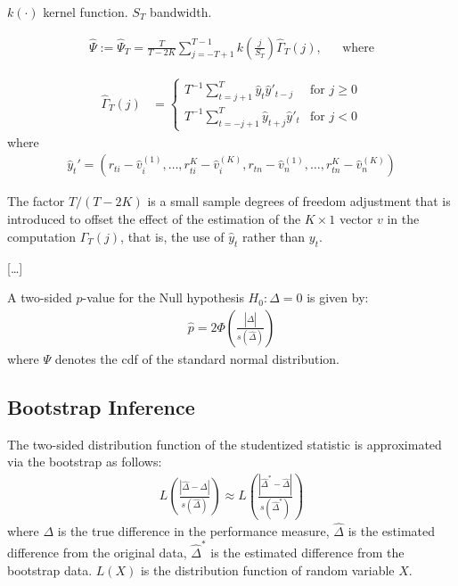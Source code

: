 \documentclass[12pt,oneside,a4paper]{article}
\begin{document}
$k(\cdot)$ kernel function.
$S_{T}$ bandwidth.

\begin{align*}
	\hat{\Psi} := \hat{\Psi}_{T} =
	\frac{T}{T-2K}
	\sum_{j=-T+1}^{T-1}
	k\left( \frac{j}{S_{T}} \right) \hat{\Gamma}_{T}(j), && \text{where}
\end{align*}

\begin{align*}
	\hat{\Gamma}_{T}(j) &=
\begin{cases}
	T^{-1} \sum_{t=j+1}^{T}	\hat{y}_{t} \hat{y}'_{t-j} & \text{for } j \geq 0
	\\
	T^{-1} \sum_{t=-j+1}^{T} \hat{y}_{t+j} \hat{y}'_{t}& \text{for } j<0
\end{cases}
\end{align*}
where
\begin{align*}
	\hat{y}_{t}' = 
\left(
	r_{ti} - \hat{v}_{i}^{(1)}, \dots , r_{ti}^K - \hat{v}_{i}^{(K)},
	r_{tn} - \hat{v}_{n}^{(1)}, \dots , r_{tn}^K - \hat{v}_{n}^{(K)} 
\right)
\end{align*}

The factor $T/(T-2K)$ is a small sample degrees of freedom adjustment that is introduced to offset the effect of the estimation of the $K \times 1$ vector $v$ in the computation $\hat{\Gamma}_{T}(j)$, that is, the use of $\hat{y}_{t}$ rather than $y_{t}$.

[\dots]

A two-sided $p$-value for the Null hypothesis $H_{0}: \Delta=0$ is given by:
\begin{align*}
	\hat{p} = 2 \Phi\left( \frac{|\hat{\Delta}|}{s(\hat{\Delta})} \right)
\end{align*}
where $\Psi$ denotes the cdf of the standard normal distribution.

\subsection{Bootstrap Inference}

The two-sided distribution function of the studentized statistic is approximated via the bootstrap as follows:
\begin{align}
L\left(
\frac{| \hat{\Delta} - \Delta |}{s(\hat{\Delta})}
\right) 
\approx
L\left(
\frac{| \hat{\Delta}^{*} - \hat{\Delta} |}{s(\hat{\Delta}^{*})}
\right) 
\end{align}
where $\Delta$ is the true difference in the performance measure, 
$\hat{\Delta}$ is the estimated difference from the original data,
$\hat{\Delta}^{*}$ is the estimated difference from the bootstrap data.
$L(X)$ is the distribution function of random variable $X$.
\end{document}
